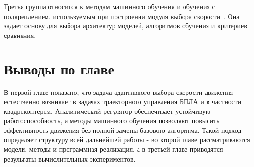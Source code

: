 Третья группа относится к методам машинного обучения и обучения с подкреплением, используемым при построении модуля выбора скорости~\cite{kingma2015adam,schulman2017ppo,haarnoja2018sac,fujimoto2018td3,shi2025}.
Она задает основу для выбора архитектур моделей, алгоритмов обучения и критериев сравнения.

\section{Выводы по главе}

В первой главе показано, что задача адаптивного выбора скорости движения естественно возникает в задачах траекторного управления БПЛА и в частности квадрокоптером.
Аналитический регулятор обеспечивает устойчивую работоспособность, а методы машинного обучения позволяют повысить эффективность движения без полной замены базового алгоритма.
Такой подход определяет структуру всей дальнейшей работы - во второй главе рассматриваются модели, методы и программная реализация, а в третьей главе приводятся результаты вычислительных экспериментов.
